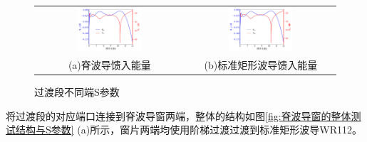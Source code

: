 \documentclass[master]{thesis-uestc}
\begin{document}
\begin{figure}[!htb]
    \small
    \centering
    \begin{tabular}{@{\ }c@{\ }c}
        \includegraphics[width=0.45\textwidth]{pic/chapter3/一端口馈入.png} & 
        \hspace{5pt}
        \includegraphics[width=0.45\textwidth]{pic/chapter3/二端口馈入.png}     \\
        \mbox{\small (a)脊波导馈入能量}                                                                               & 
        \mbox{\small (b)标准矩形波导馈入能量}                                                                                  \\
    \end{tabular}
    \caption{过渡段不同端S参数}
    \label{fig:过渡段不同端馈入的S参数}
\end{figure}

将过渡段的对应端口连接到脊波导窗两端，整体的结构如图\ref{fig:脊波导窗的整体测试结构与S参数} (a)所示，窗片两端均使用阶梯过渡过渡到标准矩形波导WR112。
\end{document}
